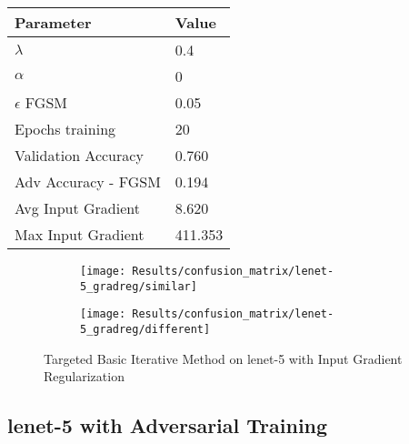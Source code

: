\documentclass[draft,final]{vutinfth} %
\begin{document}
\begin{table}[h]
  \centering
  \begin{tabular}{ll}
    \toprule
			Parameter			& Value   					\\
    \midrule
			$\lambda$								& 0.4			\\
			$\alpha$								& 0				\\
			$\epsilon$ FGSM					& 0.05		\\
			Epochs training					& 20			\\
			
			Validation Accuracy			& 0.760		\\ 
			Adv Accuracy - FGSM			& 0.194		\\
			
			Avg Input Gradient			& 8.620		\\
			Max Input Gradient			& 411.353	\\
    \bottomrule
  \end{tabular}
\end{table}


\begin{figure}[h]
  \begin{subfigure}[b]{0.5\columnwidth}
		\centering
    \texttt{[image: Results/confusion\_matrix/lenet-5\_gradreg/similar]}
    \label{fig:exp:cm:lenet-5_gradreg:similar}
  \end{subfigure}
  \begin{subfigure}[b]{0.5\columnwidth}
		\centering
    \texttt{[image: Results/confusion\_matrix/lenet-5\_gradreg/different]}
    \label{fig:exp:cm:lenet-5_gradreg:different}
  \end{subfigure}
  \caption{Targeted Basic Iterative Method on lenet-5 with Input Gradient Regularization}
  \label{fig:exp:cm:lenet-5_gradreg}
\end{figure}
\clearpage

\subsection{lenet-5 with Adversarial Training}
\end{document}
